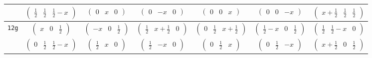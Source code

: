 \documentclass[fleqn,9pt,landscape]{jsarticle}
\begin{document}
\begin{center}
\begin{longtable}{ccccccc}
& $ \begin{pmatrix} \frac{1}{2} & \frac{1}{2} & \frac{1}{2} - x \end{pmatrix} $ & $ \begin{pmatrix} 0 & x & 0 \end{pmatrix} $ & $ \begin{pmatrix} 0 & - x & 0 \end{pmatrix} $ & $ \begin{pmatrix} 0 & 0 & x \end{pmatrix} $ & $ \begin{pmatrix} 0 & 0 & - x \end{pmatrix} $ & $ \begin{pmatrix} x + \frac{1}{2} & \frac{1}{2} & \frac{1}{2} \end{pmatrix} $ \\ \hline
{\tt 12g} & $ \begin{pmatrix} x & 0 & \frac{1}{2} \end{pmatrix} $ & $ \begin{pmatrix} - x & 0 & \frac{1}{2} \end{pmatrix} $ & $ \begin{pmatrix} \frac{1}{2} & x + \frac{1}{2} & 0 \end{pmatrix} $ & $ \begin{pmatrix} 0 & \frac{1}{2} & x + \frac{1}{2} \end{pmatrix} $ & $ \begin{pmatrix} \frac{1}{2} - x & 0 & \frac{1}{2} \end{pmatrix} $ & $ \begin{pmatrix} \frac{1}{2} & \frac{1}{2} - x & 0 \end{pmatrix} $ \\
& $ \begin{pmatrix} 0 & \frac{1}{2} & \frac{1}{2} - x \end{pmatrix} $ & $ \begin{pmatrix} \frac{1}{2} & x & 0 \end{pmatrix} $ & $ \begin{pmatrix} \frac{1}{2} & - x & 0 \end{pmatrix} $ & $ \begin{pmatrix} 0 & \frac{1}{2} & x \end{pmatrix} $ & $ \begin{pmatrix} 0 & \frac{1}{2} & - x \end{pmatrix} $ & $ \begin{pmatrix} x + \frac{1}{2} & 0 & \frac{1}{2} \end{pmatrix} $ \\ \hline

\end{longtable}
\end{center}
\end{document}
